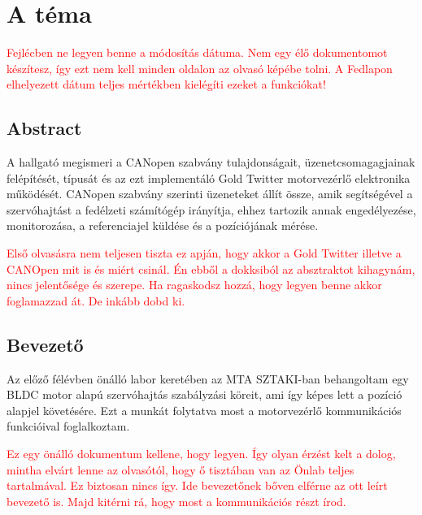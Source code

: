 \section*{A téma}

\begin{scriptsize}
\textcolor{red}{Fejlécben ne legyen benne a módosítás dátuma. Nem egy élő dokumentomot készítesz, így ezt nem kell minden oldalon az olvasó képébe tolni. A Fedlapon elhelyezett dátum teljes mértékben kielégíti ezeket a funkciókat!}
\end{scriptsize}


\subsection*{Abstract}
A hallgató megismeri a CANopen szabvány tulajdonságait, üzenetcsomagagjainak felépítését, típusát és az ezt implementáló Gold Twitter motorvezérlő elektronika működését. CANopen szabvány szerinti üzeneteket állít össze, amik segítségével a szervóhajtást a fedélzeti számítógép irányítja, ehhez tartozik annak engedélyezése, monitorozása, a referenciajel küldése és a pozíciójának mérése.

\begin{scriptsize}
\textcolor{red}{Első olvasásra nem teljesen tiszta ez apján, hogy akkor a Gold Twitter illetve a CANOpen mit is és miért csinál. Én ebből a dokksiból az absztraktot kihagynám, nincs jelentősége és szerepe. Ha ragaskodsz hozzá, hogy legyen benne akkor foglamazzad át. De inkább dobd ki.}
\end{scriptsize}


\subsection*{Bevezető}
Az előző félévben önálló labor keretében az MTA SZTAKI-ban behangoltam egy BLDC motor alapú szervóhajtás szabályzási köreit, ami így képes lett a pozíció alapjel követésére. Ezt a munkát folytatva most a motorvezérlő kommunikációs funkcióival foglalkoztam. 

\begin{scriptsize}
\textcolor{red}{Ez egy önálló dokumentum kellene, hogy legyen. Így olyan érzést kelt a dolog, mintha elvárt lenne az olvasótól, hogy ő tisztában van az Önlab teljes tartalmával. Ez biztosan nincs így. Ide bevezetőnek bőven elférne az ott leírt bevezető is. Majd kitérni rá, hogy most a kommunikációs részt írod.  }
\end{scriptsize}


